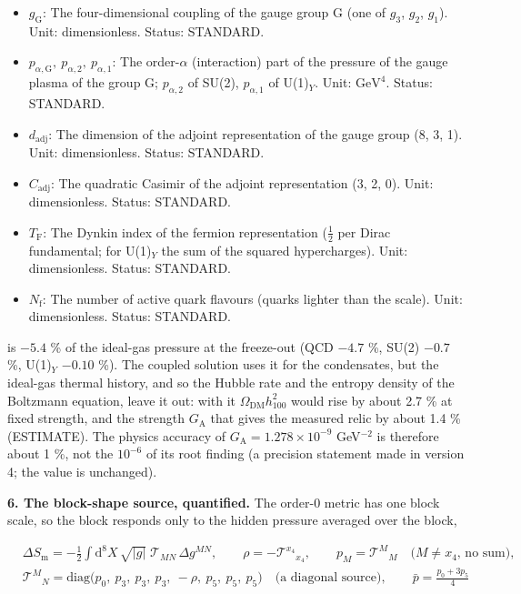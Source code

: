 \documentclass[
  10pt,
]{article}
\begin{document}
\begin{itemize}
  \(\mathrm{GeV}^{4}\) (four dimensions). Status: STANDARD.
\item
  \(g_{\mathrm{G}}\): The four-dimensional coupling of the gauge group G
  (one of \(g_3\), \(g_2\), \(g_1\)). Unit: dimensionless. Status:
  STANDARD.
\item
  \(p_{\alpha,\mathrm{G}},\ p_{\alpha,2},\ p_{\alpha,1}\): The
  order-\(\alpha\) (interaction) part of the pressure of the gauge
  plasma of the group G; \(p_{\alpha,2}\) of SU(2), \(p_{\alpha,1}\) of
  U(1)\(_Y\). Unit: \(\mathrm{GeV}^{4}\). Status: STANDARD.
\item
  \(d_{\mathrm{adj}}\): The dimension of the adjoint representation of
  the gauge group (8, 3, 1). Unit: dimensionless. Status: STANDARD.
\item
  \(C_{\mathrm{adj}}\): The quadratic Casimir of the adjoint
  representation (3, 2, 0). Unit: dimensionless. Status: STANDARD.
\item
  \(T_{\mathrm{F}}\): The Dynkin index of the fermion representation
  (\(\frac12\) per Dirac fundamental; for U(1)\(_Y\) the sum of the
  squared hypercharges). Unit: dimensionless. Status: STANDARD.
\item
  \(N_{\mathrm{f}}\): The number of active quark flavours (quarks
  lighter than the scale). Unit: dimensionless. Status: STANDARD.
\end{itemize}

is \(-5.4\) \% of the ideal-gas pressure at the freeze-out (QCD \(-4.7\)
\%, SU(2) \(-0.7\) \%, U(1)\(_Y\) \(-0.10\) \%). The coupled solution
uses it for the condensates, but the ideal-gas thermal history, and so
the Hubble rate and the entropy density of the Boltzmann equation, leave
it out: with it \(\Omega_{\mathrm{DM}}h_{100}^2\) would rise by about
2.7 \% at fixed strength, and the strength \(G_{\mathrm{A}}\) that gives
the measured relic by about 1.4 \% (ESTIMATE). The physics accuracy of
\(G_{\mathrm{A}} = 1.278\times10^{-9}\) GeV\(^{-2}\) is therefore about
1 \%, not the \(10^{-6}\) of its root finding (a precision statement
made in version 4; the value is unchanged).

\textbf{6. The block-shape source, quantified.} The order-0 metric has
one block scale, so the block responds only to the hidden pressure
averaged over the block,

\[
\begin{aligned}
&\Delta S_{\mathrm{m}} = -\frac12\int\mathrm{d}^8X\,\sqrt{\lvert g\rvert}\;\mathcal{T}_{MN}\,\Delta
 g^{MN},\qquad
 \rho = -\mathcal{T}^{x_4}{}_{x_4},\qquad p_M = \mathcal{T}^M{}_M\quad \text{($M \ne x_4$, no sum)},\\
&\mathcal{T}^M{}_N = \mathrm{diag}\big(p_0,\ p_3,\ p_3,\ p_3,\ -\rho,\ p_5,\ p_5,\ p_5\big)\quad
 \text{(a diagonal source)},\qquad \bar p = \frac{p_0 + 3p_5}{4}
\end{aligned} \tag{FE-2}
\]
\end{document}
